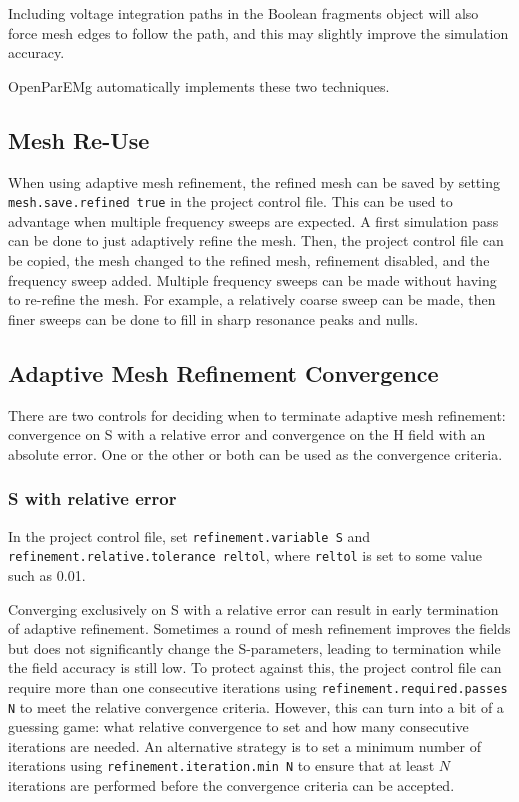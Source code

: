 \documentclass[titlepage]{article}
\renewcommand\_{\textunderscore\linebreak[1]}
\begin{document}
Including voltage integration paths in the Boolean fragments object will also force mesh edges to follow the path, and this may slightly improve the simulation accuracy.

OpenParEMg automatically implements these two techniques.

\subsection{Mesh Re-Use}

When using adaptive mesh refinement, the refined mesh can be saved by setting \texttt{mesh.save.refined true} in the project control file.  This can be used to advantage when multiple frequency sweeps are expected.  A first simulation pass can be done to just adaptively refine the mesh.  Then, the project control file can be copied, the mesh changed to the refined mesh, refinement disabled, and the frequency sweep added.  Multiple frequency sweeps can be made without having to re-refine the mesh.  For example, a relatively coarse sweep can be made, then finer sweeps can be done to fill in sharp resonance peaks and nulls.

\subsection{Adaptive Mesh Refinement Convergence}

There are two controls for deciding when to terminate adaptive mesh refinement: convergence on S with a relative error and convergence on the H field with an absolute error.  One or the other or both can be used as the convergence criteria.

\subsubsection{S with relative error}

In the project control file, set \texttt{refinement.variable S} and \texttt{refinement.relative.tolerance reltol}, where \texttt{reltol} is set to some value such as 0.01.

Converging exclusively on S with a relative error can result in early termination of adaptive refinement.  Sometimes a round of mesh refinement improves the fields but does not significantly change the S-parameters, leading to termination while the field accuracy is still low.  To protect against this, the project control file can require more than one consecutive iterations using \texttt{refinement.required.passes N} to meet the relative convergence criteria.  However, this can turn into a bit of a guessing game: what relative convergence to set and how many consecutive iterations are needed.  An alternative strategy is to set a minimum number of iterations using \texttt{refinement.iteration.min N} to ensure that at least $N$ iterations are performed before the convergence criteria can be accepted.
\end{document}
